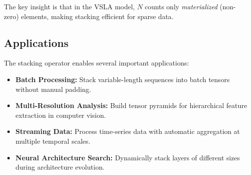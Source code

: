 The key insight is that in the VSLA model, $N$ counts only \emph{materialized} (non-zero) elements, making stacking efficient for sparse data.

\subsection{Applications}

The stacking operator enables several important applications:

\begin{itemize}
\item \textbf{Batch Processing:} Stack variable-length sequences into batch tensors without manual padding.
\item \textbf{Multi-Resolution Analysis:} Build tensor pyramids for hierarchical feature extraction in computer vision.
\item \textbf{Streaming Data:} Process time-series data with automatic aggregation at multiple temporal scales.
\item \textbf{Neural Architecture Search:} Dynamically stack layers of different sizes during architecture evolution.
\end{itemize}
